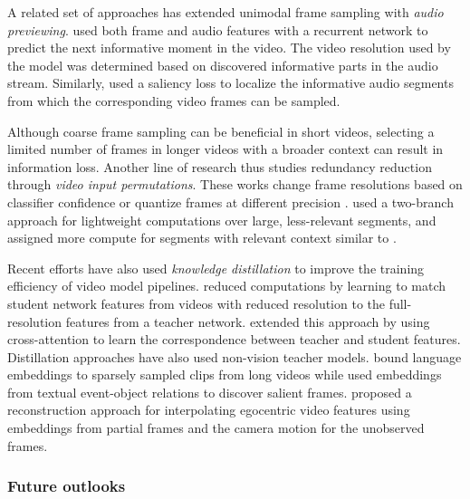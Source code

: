 A related set of approaches has extended unimodal frame sampling with \emph{audio previewing}. \citet{gao2020listen} used both frame and audio features with a recurrent network to predict the next informative moment in the video. The video resolution used by the model was determined based on discovered informative parts in the audio stream. Similarly, \citet{nugroho2023audio} used a saliency loss to localize the informative audio segments from which the corresponding video frames can be sampled. 

Although coarse frame sampling can be beneficial in short videos, selecting a limited number of frames in longer videos with a broader context can result in information loss. Another line of research thus studies redundancy reduction through \emph{video input permutations}. These works change frame resolutions based on classifier confidence \citep{meng2020ar} or quantize frames at different precision \citep{abati2023resq,sun2021dynamic}. \citet{zhang2022look} used a two-branch approach for lightweight computations over large, less-relevant segments, and assigned more compute for segments with relevant context similar to \citep{feichtenhofer2019slowfast}.  

Recent efforts have also used \emph{knowledge distillation} to improve the training efficiency of video model pipelines. \citet{ma2022rethinking} reduced computations by learning to match student network features from videos with reduced resolution to the full-resolution features from a teacher network. \citet{kim2021efficient} extended this approach by using cross-attention to learn the correspondence between teacher and student features. Distillation approaches have also used non-vision teacher models. \citet{lei2021less} bound language embeddings to sparsely sampled clips from long videos while \citet{xia2022temporal} used embeddings from textual event-object relations to discover salient frames. \citet{tan2023egodistill} proposed a reconstruction approach for interpolating egocentric video features using embeddings from partial frames and the camera motion for the unobserved frames.

\subsubsection{Future outlooks} 

